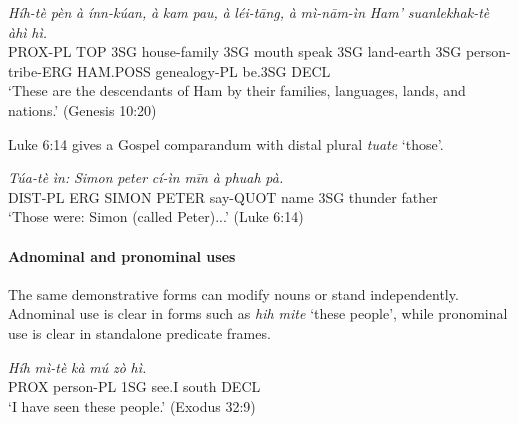 \documentclass[
  11pt,
  a4paper,
]{article}
\newcommand{\tdim}[1]{\textit{#1}}
\newcommand{\tdimword}[1]{\textit{#1}}
\renewcommand{\textsc}[1]{{\footnotesize\MakeUppercase{#1}}}
\newcommand{\glossquote}[1]{`#1'}
\begin{document}
\begin{exe}
\ex \label{ex:dem-hihte}
\gll \tdimword{Híh-tè} \tdimword{pèn} \tdimword{à} \tdimword{ínn-kúan,} \tdimword{à} \tdimword{kam} \tdimword{pau,} \tdimword{à} \tdimword{léi-tāng,} \tdimword{à} \tdimword{mì-nām-ìn} \tdimword{Ham'} \tdimword{suanlekhak-tè} \tdimword{àhì} \tdimword{hì.} \\
     \textsc{prox}-\textsc{pl} \textsc{top} \textsc{3sg} house-family \textsc{3sg} mouth speak \textsc{3sg} land-earth \textsc{3sg} person-tribe-\textsc{erg} \textsc{ham}.\textsc{poss} genealogy-\textsc{pl} be.\textsc{3sg} \textsc{decl} \\
\glt \glossquote{These are the descendants of Ham by their families, languages, lands, and nations.} (Genesis 10:20)
\end{exe}

Luke 6:14 gives a Gospel comparandum with distal plural \tdim{tuate}
\glossquote{those}.

\begin{exe}
\ex \label{ex:dem-tuate}
\gll \tdimword{Túa-tè} \tdimword{ìn:} \tdimword{Simon} \tdimword{peter} \tdimword{cí-ìn} \tdimword{mīn} \tdimword{à} \tdimword{phuah} \tdimword{pà.} \\
     \textsc{dist}-\textsc{pl} \textsc{erg} \textsc{simon} \textsc{peter} say-\textsc{quot} name \textsc{3sg} thunder father \\
\glt \glossquote{Those were: Simon (called Peter)...} (Luke 6:14)
\end{exe}

\paragraph{Adnominal and pronominal
uses}\label{adnominal-and-pronominal-uses}

The same demonstrative forms can modify nouns or stand independently.
Adnominal use is clear in forms such as \tdim{hih mite}
\glossquote{these people}, while pronominal use is clear in standalone
predicate frames.

\begin{exe}
\ex \label{ex:dem-adnominal-hih}
\gll \tdimword{Híh} \tdimword{mì-tè} \tdimword{kà} \tdimword{mú} \tdimword{zò} \tdimword{hì.} \\
     \textsc{prox} person-\textsc{pl} \textsc{1sg} see.\textsc{i} south \textsc{decl} \\
\glt \glossquote{I have seen these people.} (Exodus 32:9)
\end{exe}
\end{document}
